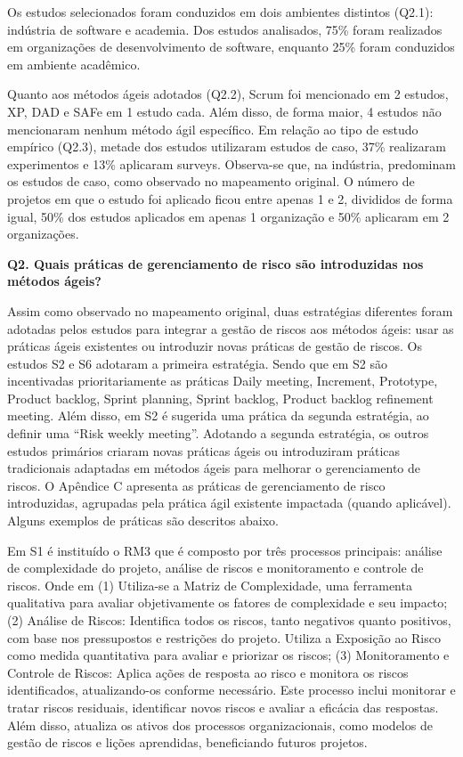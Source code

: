 \documentclass[
	12pt,
	openright,
	twoside,
	a4paper,
	english,
	brazil
	]{abntex2}
\begin{document}
Os estudos selecionados foram conduzidos em dois ambientes distintos (Q2.1): indústria de software e academia. Dos estudos analisados, 75\% foram realizados em organizações de desenvolvimento de software, enquanto 25\% foram conduzidos em ambiente acadêmico.

Quanto aos métodos ágeis adotados (Q2.2), Scrum foi mencionado em 2 estudos, XP, DAD e SAFe em 1 estudo cada. Além disso, de forma maior, 4 estudos não mencionaram nenhum método ágil específico.
Em relação ao tipo de estudo empírico (Q2.3), metade dos estudos utilizaram estudos de caso, 37\% realizaram experimentos e 13\% aplicaram surveys. Observa-se que, na indústria, predominam os estudos de caso, como observado no mapeamento original.
O número de projetos em que o estudo foi aplicado ficou entre apenas 1 e 2, divididos de forma igual, 50\% dos estudos aplicados em apenas 1 organização e 50\% aplicaram em 2 organizações.

\textbf{Q2. Quais práticas de gerenciamento de risco são introduzidas nos métodos ágeis?}

Assim como observado no mapeamento original, duas estratégias diferentes foram adotadas pelos estudos para integrar a gestão de riscos aos métodos ágeis: usar as práticas ágeis existentes ou introduzir novas práticas de gestão de riscos.
Os estudos S2 e S6 adotaram a primeira estratégia. Sendo que em S2 são incentivadas prioritariamente as práticas Daily meeting, Increment, Prototype, Product backlog, Sprint planning, Sprint backlog, Product backlog refinement meeting. Além disso, em S2 é sugerida uma prática da segunda estratégia, ao definir uma “Risk weekly meeting”.
Adotando a segunda estratégia, os outros estudos primários criaram novas práticas ágeis ou introduziram práticas tradicionais adaptadas em métodos ágeis para melhorar o gerenciamento de riscos. O Apêndice C apresenta as práticas de gerenciamento de risco introduzidas, agrupadas pela prática ágil existente impactada (quando aplicável). Alguns exemplos de práticas são descritos abaixo.

Em S1 é instituído o RM3 que é composto por três processos principais: análise de complexidade do projeto, análise de riscos e monitoramento e controle de riscos. Onde em (1) Utiliza-se a Matriz de Complexidade, uma ferramenta qualitativa para avaliar objetivamente os fatores de complexidade e seu impacto; (2) Análise de Riscos: Identifica todos os riscos, tanto negativos quanto positivos, com base nos pressupostos e restrições do projeto. Utiliza a Exposição ao Risco como medida quantitativa para avaliar e priorizar os riscos; (3) Monitoramento e Controle de Riscos: Aplica ações de resposta ao risco e monitora os riscos identificados, atualizando-os conforme necessário. Este processo inclui monitorar e tratar riscos residuais, identificar novos riscos e avaliar a eficácia das respostas. Além disso, atualiza os ativos dos processos organizacionais, como modelos de gestão de riscos e lições aprendidas, beneficiando futuros projetos.
\end{document}
